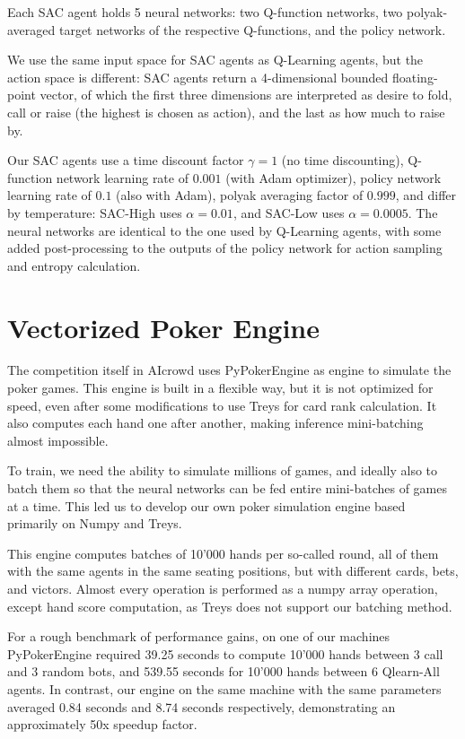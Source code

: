 Each SAC agent holds 5 neural networks: two Q-function networks, two polyak-averaged target networks of the respective Q-functions, and the policy network.

We use the same input space for SAC agents as Q-Learning agents, but the action space is different: SAC agents return a 4-dimensional bounded floating-point vector, of which the first three dimensions are interpreted as desire to fold, call or raise (the highest is chosen as action), and the last as how much to raise by.

Our SAC agents use a time discount factor $\gamma = 1$ (no time discounting), Q-function network learning rate of $0.001$ (with Adam optimizer), policy network learning rate of $0.1$ (also with Adam), polyak averaging factor of $0.999$, and differ by temperature: SAC-High uses $\alpha = 0.01$, and SAC-Low uses $\alpha = 0.0005$. The neural networks are identical to the one used by Q-Learning agents, with some added post-processing to the outputs of the policy network for action sampling and entropy calculation.

\section{Vectorized Poker Engine}
The competition itself in AIcrowd uses PyPokerEngine \cite{Pypokerengine} as engine to simulate the poker games. This engine is built in a flexible way, but it is not optimized for speed, even after some modifications to use Treys \cite{Treys} for card rank calculation. It also computes each hand one after another, making inference mini-batching almost impossible.

To train, we need the ability to simulate millions of games, and ideally also to batch them so that the neural networks can be fed entire mini-batches of games at a time. This led us to develop our own poker simulation engine based primarily on Numpy \cite{Numpy} and Treys.

This engine computes batches of 10'000 hands per so-called round, all of them with the same agents in the same seating positions, but with different cards, bets, and victors. Almost every operation is performed as a numpy array operation, except hand score computation, as Treys does not support our batching method.

For a rough benchmark of performance gains, on one of our machines PyPokerEngine required 39.25 seconds to compute 10'000 hands between 3 call and 3 random bots, and 539.55 seconds for 10'000 hands between 6 Qlearn-All agents. In contrast, our engine on the same machine with the same parameters averaged 0.84 seconds and 8.74 seconds respectively, demonstrating an approximately 50x speedup factor.

